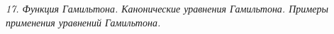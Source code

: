 \emph{17. Функция Гамильтона. Канонические уравнения Гамильтона. Примеры
применения уравнений Гамильтона.}

\newpage
